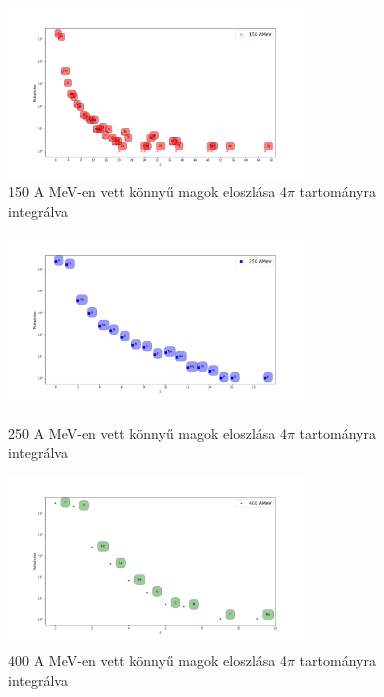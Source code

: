 \documentclass[a4paper,12pt]{article}
\begin{document}
\begin{figure}[H]
\begin{minipage}{\textwidth}
\centering
\includegraphics[width=0.7\textwidth]{./chemical150.png}
\caption{150 A MeV-en vett könnyű magok eloszlása 4$\pi$ tartományra integrálva}
\end{minipage}
\end{figure}
\begin{figure}[!htb]
\begin{minipage}{\textwidth}
\centering
\includegraphics[width=0.7\textwidth]{./chemical250.png}
\caption{250 A MeV-en vett könnyű magok eloszlása 4$\pi$ tartományra integrálva}
\end{minipage}
\begin{minipage}{\textwidth}
\centering
\includegraphics[width=0.7\textwidth]{./chemical400.png}
\caption{400 A MeV-en vett könnyű magok eloszlása 4$\pi$ tartományra integrálva}
\end{minipage}
\end{figure}
\end{document}
